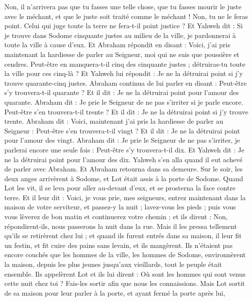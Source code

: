 \begin{multicols}{2}
Non, il n'arrivera pas que tu fasses une telle chose, que tu fasses mourir le juste avec le méchant, et que le juste soit traité comme le méchant ! Non, tu ne le feras point. Celui qui juge toute la terre ne fera-t-il point justice ?
Et Yahweh dit : Si je trouve dans Sodome cinquante justes au milieu de la ville, je pardonnerai à toute la ville à cause d'eux.
Et Abraham répondit en disant : Voici, j'ai pris maintenant la hardiesse de parler au Seigneur, moi qui ne suis que poussière et cendres.
Peut-être en manquera-t-il cinq des cinquante justes ; détruiras-tu toute la ville pour ces cinq-là ? Et Yahweh lui répondit : Je ne la détruirai point si j'y trouve quarante-cinq justes.
Abraham continua de lui parler en disant : Peut-être s'y trouvera-t-il quarante ? Et il dit : Je ne la détruirai point pour l'amour des quarante.
Abraham dit : Je prie le Seigneur de ne pas s'irriter si je parle encore. Peut-être s'en trouvera-t-il trente ? Et il dit : Je ne la détruirai point si j'y trouve trente.
Abraham dit : Voici, maintenant j'ai pris la hardiesse de parler au Seigneur : Peut-être s'en trouvera-t-il vingt ? Et il dit : Je ne la détruirai point pour l'amour des vingt.
Abraham dit : Je prie le Seigneur de ne pas s'irriter, je parlerai encore une seule fois : Peut-être s'y trouvera-t-il dix. Et Yahweh dit : Je ne la détruirai point pour l'amour des dix.
Yahweh s'en alla quand il eut achevé de parler avec Abraham. Et Abraham retourna dans sa demeure.
\VerseOne{}Sur le soir, les deux anges arrivèrent à Sodome, et Lot était assis à la porte de Sodome. Quand Lot les vit, il se leva pour aller au-devant d'eux, et se prosterna la face contre terre.
Et il leur dit : Voici, je vous prie, mes seigneurs, entrez maintenant dans la maison de votre serviteur, et passez-y la nuit ; lavez-vous les pieds ; puis vous vous lèverez de bon matin et continuerez votre chemin ; et ils dirent : Non, répondirent-ils, nous passerons la nuit dans la rue.
Mais il les pressa tellement qu'ils se retirèrent chez lui ; et quand ils furent entrés dans sa maison, il leur fit un festin, et fit cuire des pains sans levain, et ils mangèrent.
Ils n’étaient pas encore couchés que les hommes de la ville, les hommes de Sodome, environnèrent la maison, depuis les plus jeunes jusqu'aux vieillards, tout le peuple était ensemble.
Ils appelèrent Lot et ils lui dirent : Où sont les hommes qui sont venus cette nuit chez toi ? Fais-les sortir afin que nous les connaissions.
Mais Lot sortit de sa maison pour leur parler à la porte, et ayant fermé la porte après lui,

\end{multicols}
